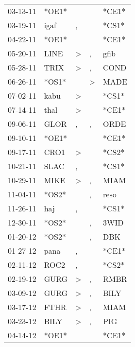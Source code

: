 \begin{supertabular}{lllll}
 03-13-11 &  *OE1* &                  &                  &  *CE1* \\
 03-19-11 &   igaf &                , &                  &  *CS1* \\
 04-22-11 &  *OE1* &                  &                  &  *CE1* \\
 05-20-11 &   LINE &     \textgreater &                , &   gfib \\
 05-28-11 &   TRIX &     \textgreater &                , &   COND \\
 06-26-11 &  *OS1* &                  &     \textgreater &   MADE \\
 07-02-11 &   kabu &     \textgreater &                  &  *CS1* \\
 07-14-11 &   thal &     \textgreater &                  &  *CE1* \\
 09-06-11 &   GLOR &                , &                , &   ORDE \\
 09-10-11 &  *OE1* &                  &                  &  *CE1* \\
 09-17-11 &   CRO1 &     \textgreater &                  &  *CS2* \\
 10-21-11 &   SLAC &                , &                  &  *CS1* \\
 10-29-11 &   MIKE &     \textgreater &                , &   MIAM \\
 11-04-11 &  *OS2* &                  &                , &   reso \\
 11-26-11 &    haj &                , &                  &  *CS1* \\
 12-30-11 &  *OS2* &                  &                , &   3WID \\
 01-20-12 &  *OS2* &                  &                , &    DBK \\
 01-27-12 &   pana &                , &                  &  *CE1* \\
 02-11-12 &   ROC2 &                , &                  &  *CS2* \\
 02-19-12 &   GURG &     \textgreater &                , &   RMBR \\
 03-09-12 &   GURG &     \textgreater &                , &   BILY \\
 03-17-12 &   FTHR &     \textgreater &                , &   MIAM \\
 03-23-12 &   BILY &     \textgreater &                , &    PIG \\
 04-14-12 &  *OE1* &                  &                  &  *CE1* \\

\end{supertabular}
